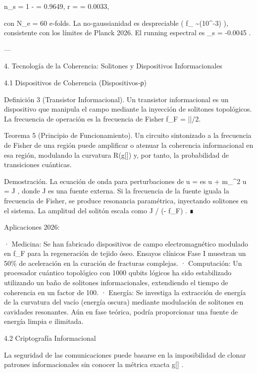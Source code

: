 \documentclass[12pt,twoside]{book}
\begin{document}
n_s = 1 -  = 0.9649, \quad r =  = 0.0033,

con  N_e = 60  e‑folds. La no‑gaussianidad es despreciable ( f_{} \sim {}(10^{-3}) ), consistente con los límites de Planck 2026. El running espectral es  \alpha_s = -0.0045 .

---

4. Tecnología de la Coherencia: Solitones y Dispositivos Informacionales

4.1 Dispositivos de Coherencia (Dispositivos‑ρ)

Definición 3 (Transistor Informacional). Un transistor informacional es un dispositivo que manipula el campo  \rho  mediante la inyección de solitones topológicos. La frecuencia de operación es la frecuencia de Fisher  f_F = |\nabla \ln \rho|/2\pi .

Teorema 5 (Principio de Funcionamiento). Un circuito sintonizado a la frecuencia de Fisher de una región  \Omega  puede amplificar o atenuar la coherencia informacional en esa región, modulando la curvatura  R(g[\rho])  y, por tanto, la probabilidad de transiciones cuánticas.

Demostración. La ecuación de onda para perturbaciones de  u = \sqrt{\rho}  es  \square \delta u + m_{}^2 \delta u = J , donde  J  es una fuente externa. Si la frecuencia de la fuente iguala la frecuencia de Fisher, se produce resonancia paramétrica, inyectando solitones en el sistema. La amplitud del solitón escala como  \propto J / (\omega - f_F) . ∎

Aplicaciones 2026:

· Medicina: Se han fabricado dispositivos de campo electromagnético modulado en  f_F  para la regeneración de tejido óseo. Ensayos clínicos Fase I muestran un 50\% de aceleración en la curación de fracturas complejas.
· Computación: Un procesador cuántico topológico con 1000 qubits lógicos ha sido estabilizado utilizando un baño de solitones informacionales, extendiendo el tiempo de coherencia en un factor de 100.
· Energía: Se investiga la extracción de energía de la curvatura del vacío (energía oscura) mediante modulación de solitones en cavidades resonantes. Aún en fase teórica, podría proporcionar una fuente de energía limpia e ilimitada.

4.2 Criptografía Informacional

La seguridad de las comunicaciones puede basarse en la imposibilidad de clonar patrones informacionales sin conocer la métrica exacta  g[\rho] .
\end{document}
